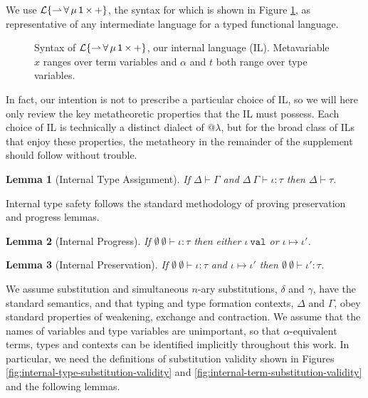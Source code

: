\documentclass[12pt]{article}
\newtheorem{lemma}{Lemma}
\begin{document}
We use {$\mathcal{L}\{{\rightharpoonup}\,{\forall}\,{\mu}\,{{\sf 1}}\,{\times}\,{+}\}$}, the syntax for which is shown in Figure \ref{syntax-IL}, as representative of any intermediate language for a typed functional language. 

\begin{figure}[h!]
\small
\hspace{-5px}
\caption{Syntax of {$\mathcal{L}\{{\rightharpoonup}\,{\forall}\,{\mu}\,{{\sf 1}}\,{\times}\,{+}\}$}, our internal language (IL). Metavariable $x$ ranges over term variables and $\alpha$ and $t$ both range over type variables.}
\label{syntax-IL}
\end{figure}

In fact, our intention is not to prescribe a particular choice of IL, so we will here only review the key metatheoretic properties that the IL must possess. Each choice of IL is technically a distinct dialect of @$\lambda$, but for the broad class of ILs that enjoy these properties, the metatheory in the remainder of the supplement should follow without trouble.

\begin{lemma}[Internal Type Assignment]
If $\Delta \vdash \Gamma$ and $\Delta~\Gamma \vdash \iota : \tau$ then $\Delta \vdash \tau$.
\end{lemma}

Internal type safety follows the standard methodology of proving preservation and progress lemmas.

\begin{lemma}[Internal Progress]
If $\emptyset~\emptyset \vdash \iota : \tau$ then either $\iota~\texttt{val}$ or $\iota \mapsto \iota'$.
\end{lemma}
\begin{lemma}[Internal Preservation]
If $\emptyset~\emptyset \vdash \iota : \tau$ and $\iota \mapsto \iota'$ then $\emptyset~\emptyset \vdash \iota' : \tau$. 
\end{lemma}

We assume substitution and simultaneous $n$-ary substitutions, $\delta$ and $\gamma$, have the standard semantics, and that typing and type formation contexts, $\Delta$ and $\Gamma$, obey standard properties of weakening, exchange and contraction. We assume that the names of variables and type variables are unimportant, so that $\alpha$-equivalent terms, types and contexts can be identified implicitly throughout this work. In particular, we need the definitions of substitution validity shown in Figures \ref{fig:internal-type-substitution-validity} and \ref{fig:internal-term-substitution-validity} and the following lemmas.
\end{document}
